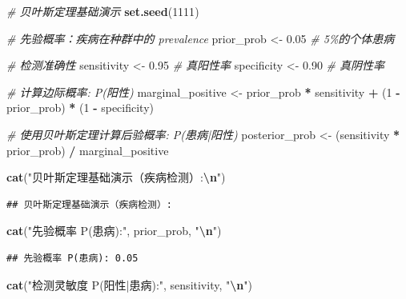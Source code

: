 \documentclass[
]{book}
\newenvironment{Shaded}{\begin{snugshade}}{\end{snugshade}}
\newcommand{\CommentTok}[1]{\textcolor[rgb]{0.56,0.35,0.01}{\textit{#1}}}
\newcommand{\DecValTok}[1]{\textcolor[rgb]{0.00,0.00,0.81}{#1}}
\newcommand{\FloatTok}[1]{\textcolor[rgb]{0.00,0.00,0.81}{#1}}
\newcommand{\FunctionTok}[1]{\textcolor[rgb]{0.13,0.29,0.53}{\textbf{#1}}}
\newcommand{\NormalTok}[1]{#1}
\newcommand{\OtherTok}[1]{\textcolor[rgb]{0.56,0.35,0.01}{#1}}
\newcommand{\SpecialCharTok}[1]{\textcolor[rgb]{0.81,0.36,0.00}{\textbf{#1}}}
\newcommand{\StringTok}[1]{\textcolor[rgb]{0.31,0.60,0.02}{#1}}
\begin{document}
\begin{Shaded}
\begin{Highlighting}[]
\CommentTok{\# 贝叶斯定理基础演示}
\FunctionTok{set.seed}\NormalTok{(}\DecValTok{1111}\NormalTok{)}

\CommentTok{\# 先验概率：疾病在种群中的 prevalence}
\NormalTok{prior\_prob }\OtherTok{\textless{}{-}} \FloatTok{0.05}  \CommentTok{\# 5\%的个体患病}

\CommentTok{\# 检测准确性}
\NormalTok{sensitivity }\OtherTok{\textless{}{-}} \FloatTok{0.95}  \CommentTok{\# 真阳性率}
\NormalTok{specificity }\OtherTok{\textless{}{-}} \FloatTok{0.90}  \CommentTok{\# 真阴性率}

\CommentTok{\# 计算边际概率: P(阳性)}
\NormalTok{marginal\_positive }\OtherTok{\textless{}{-}}\NormalTok{ prior\_prob }\SpecialCharTok{*}\NormalTok{ sensitivity }\SpecialCharTok{+}\NormalTok{ (}\DecValTok{1} \SpecialCharTok{{-}}\NormalTok{ prior\_prob) }\SpecialCharTok{*}\NormalTok{ (}\DecValTok{1} \SpecialCharTok{{-}}\NormalTok{ specificity)}

\CommentTok{\# 使用贝叶斯定理计算后验概率: P(患病|阳性)}
\NormalTok{posterior\_prob }\OtherTok{\textless{}{-}}\NormalTok{ (sensitivity }\SpecialCharTok{*}\NormalTok{ prior\_prob) }\SpecialCharTok{/}\NormalTok{ marginal\_positive}

\FunctionTok{cat}\NormalTok{(}\StringTok{"贝叶斯定理基础演示（疾病检测）:}\SpecialCharTok{\textbackslash{}n}\StringTok{"}\NormalTok{)}
\end{Highlighting}
\end{Shaded}

\begin{verbatim}
## 贝叶斯定理基础演示（疾病检测）:
\end{verbatim}

\begin{Shaded}
\begin{Highlighting}[]
\FunctionTok{cat}\NormalTok{(}\StringTok{"先验概率 P(患病):"}\NormalTok{, prior\_prob, }\StringTok{"}\SpecialCharTok{\textbackslash{}n}\StringTok{"}\NormalTok{)}
\end{Highlighting}
\end{Shaded}

\begin{verbatim}
## 先验概率 P(患病): 0.05
\end{verbatim}

\begin{Shaded}
\begin{Highlighting}[]
\FunctionTok{cat}\NormalTok{(}\StringTok{"检测灵敏度 P(阳性|患病):"}\NormalTok{, sensitivity, }\StringTok{"}\SpecialCharTok{\textbackslash{}n}\StringTok{"}\NormalTok{)}
\end{Highlighting}
\end{Shaded}
\end{document}
